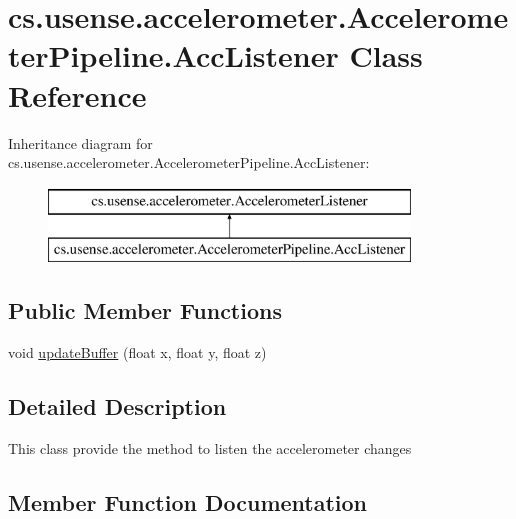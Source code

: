 \hypertarget{classcs_1_1usense_1_1accelerometer_1_1_accelerometer_pipeline_1_1_acc_listener}{}\section{cs.\+usense.\+accelerometer.\+Accelerometer\+Pipeline.\+Acc\+Listener Class Reference}
\label{classcs_1_1usense_1_1accelerometer_1_1_accelerometer_pipeline_1_1_acc_listener}
Inheritance diagram for cs.\+usense.\+accelerometer.\+Accelerometer\+Pipeline.\+Acc\+Listener\+:\begin{figure}[H]
\begin{center}
\leavevmode
\includegraphics[height=2.000000cm]{classcs_1_1usense_1_1accelerometer_1_1_accelerometer_pipeline_1_1_acc_listener}
\end{center}
\end{figure}
\subsection*{Public Member Functions}
\begin{DoxyCompactItemize}
\item 
void \hyperlink{classcs_1_1usense_1_1accelerometer_1_1_accelerometer_pipeline_1_1_acc_listener_a7970f39db6a5e22979e4722cda83dc34}{update\+Buffer} (float x, float y, float z)
\end{DoxyCompactItemize}


\subsection{Detailed Description}
This class provide the method to listen the accelerometer changes 

\subsection{Member Function Documentation}
\hypertarget{classcs_1_1usense_1_1accelerometer_1_1_accelerometer_pipeline_1_1_acc_listener_a7970f39db6a5e22979e4722cda83dc34}{}
